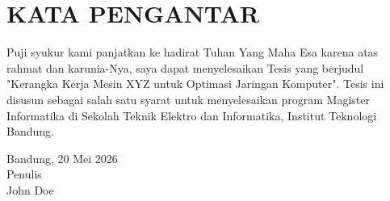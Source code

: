 \chapter*{KATA PENGANTAR}

Puji syukur kami panjatkan ke hadirat Tuhan Yang Maha Esa karena atas rahmat dan karunia-Nya, saya dapat menyelesaikan Tesis yang berjudul "Kerangka Kerja Mesin XYZ untuk Optimasi Jaringan Komputer". Tesis ini disusun sebagai salah satu syarat untuk menyelesaikan program Magister Informatika di Sekolah Teknik Elektro dan Informatika, Institut Teknologi Bandung.
\begin{flushright}
    Bandung, 20 Mei 2026\\
    
    Penulis \\
    \vspace{1cm}
    John Doe
\end{flushright}
